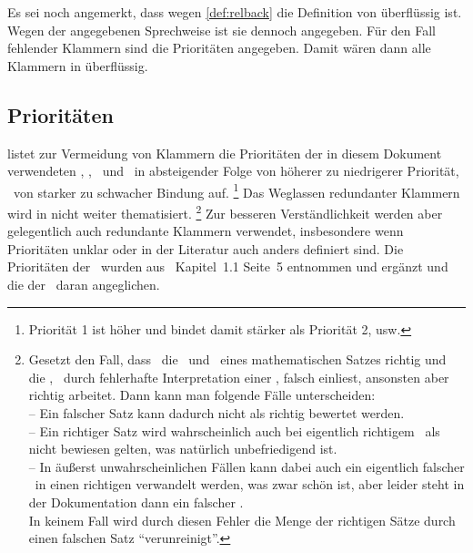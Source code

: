 Es sei noch angemerkt, dass wegen \eqref{def:relback} die Definition von \chrqt{\symmetarep}  überflüssig ist.
Wegen der angegebenen Sprechweise ist sie dennoch angegeben.
Für den Fall fehlender Klammern sind die Prioritäten  angegeben.
Damit wären dann alle Klammern in  überflüssig.

\subsection{Prioritäten}%
\label{sub:Prioritäten}

 listet zur Vermeidung von Klammern die Prioritäten der in diesem Dokument verwendeten \Operationen, \Relationen, \Junktoren\ und \Definitionen\ in absteigender Folge von höherer zu niedrigerer Priorität, \textdh\ von starker zu schwacher Bindung auf.%
\footnote{Priorität 1 ist höher und bindet damit stärker als Priorität 2, usw.}
Das Weglassen redundanter Klammern wird in  nicht weiter thematisiert.%
\footnote{%
	Gesetzt den Fall, dass \ASBA\ die \Voraussetzungen\ und \Folgerungen\ eines mathematischen Satzes richtig und die \Beweisschritte, \textzB\ durch fehlerhafte Interpretation einer \Formel, falsch einliest, ansonsten aber richtig arbeitet.
	Dann kann man folgende Fälle unterscheiden:\\
	-- Ein falscher Satz kann dadurch nicht als richtig bewertet werden.\\
	-- Ein richtiger Satz wird wahrscheinlich auch bei eigentlich richtigem \Beweis\ als nicht bewiesen gelten, was natürlich unbefriedigend ist.\\
	-- In äußerst unwahrscheinlichen Fällen kann dabei auch ein eigentlich falscher \Beweis\ in einen richtigen verwandelt werden, was zwar schön ist, aber leider steht in der Dokumentation dann ein falscher \Beweis.\\
	In keinem Fall wird durch diesen Fehler die Menge der richtigen Sätze durch einen falschen Satz \enquote{verunreinigt}.
}
Zur besseren Verständlichkeit werden aber gelegentlich auch redundante Klammern verwendet, insbesondere wenn Prioritäten unklar oder in der Literatur auch anders definiert sind.
Die Prioritäten der \Junktoren\ wurden aus~\cite{bib:Rautenberg} Kapitel~1.1 Seite~5 entnommen und ergänzt und die der \Metaoperationen\ daran angeglichen.

